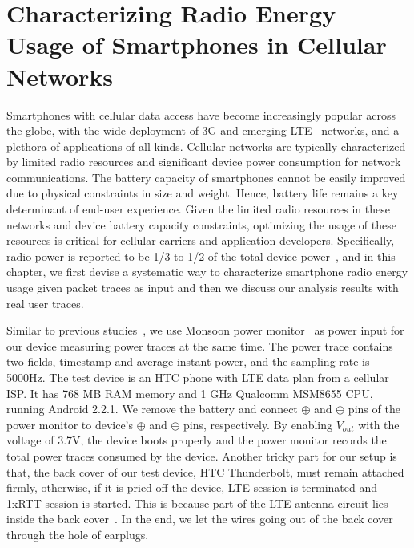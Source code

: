 \chapter{Characterizing Radio Energy Usage of Smartphones in Cellular Networks} 
\label{chap:power}

Smartphones with cellular data access have become increasingly popular across the globe, with the wide deployment of 3G and emerging LTE~\cite{3gpp.lte} networks, and a plethora of applications of all kinds. Cellular networks are typically characterized by limited radio resources and significant device power consumption for network communications. The battery capacity of smartphones cannot be easily improved due to physical constraints in size and weight. Hence, battery life remains a key determinant of end-user experience. Given the limited radio resources in these networks and device battery capacity constraints, optimizing the usage of these resources is critical for cellular carriers and application developers. Specifically, radio power is reported to be 1/3 to 1/2 of the total device power~\cite{mobisys.aro}, and in this chapter, we first devise a systematic way to characterize smartphone radio energy usage given packet traces as input and then we discuss our analysis results with real user traces.


Similar to previous studies~\cite{imc.3g, codes.powertutor}, we use Monsoon power monitor~\cite{monsoon} as power input for our device measuring power traces at the same time. The power trace contains two fields, timestamp and average instant power, and the sampling rate is 5000Hz. The test device is an HTC phone with LTE data plan from a cellular ISP. It has 768 MB RAM memory and 1 GHz Qualcomm MSM8655 CPU, running Android 2.2.1. We remove the battery and connect $\oplus$ and $\ominus$ pins of the power monitor to device's $\oplus$ and $\ominus$ pins, respectively. By enabling $V_{out}$ with the voltage of 3.7V, the device boots properly and the power monitor records the total power traces consumed by the device. Another tricky part for our setup is that, the back cover of our test device, HTC Thunderbolt, must remain attached firmly, otherwise, if it is pried off the device, LTE session is terminated and 1xRTT session is started. This is because part of the LTE antenna circuit lies inside the back cover~\cite{thunderbolt}. In the end, we let the wires going out of the back cover through the hole of earplugs.


